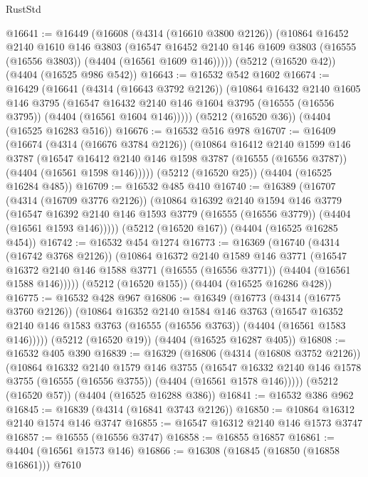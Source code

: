 \begin{lexlean}{RustStd}
\begin{coremodule}
{\begin{coremodule}
{{{{{{{{{{{{{{{{@16641 := @16449
    (@16608
      (@4314 (@16610 @3800 @2126))
      (@10864
        @16452
        @2140
        @1610
        @146
        @3803
        (@16547 @16452 @2140 @146 @1609 @3803 (@16555 (@16556 @3803)) (@4404 (@16561 @1609 @146)))))
    (@5212 (@16520 @42))
    (@4404 (@16525 @986 @542))
@16643 := @16532 @542 @1602
@16674 := @16429
    (@16641
      (@4314 (@16643 @3792 @2126))
      (@10864
        @16432
        @2140
        @1605
        @146
        @3795
        (@16547 @16432 @2140 @146 @1604 @3795 (@16555 (@16556 @3795)) (@4404 (@16561 @1604 @146)))))
    (@5212 (@16520 @36))
    (@4404 (@16525 @16283 @516))
@16676 := @16532 @516 @978
@16707 := @16409
    (@16674
      (@4314 (@16676 @3784 @2126))
      (@10864
        @16412
        @2140
        @1599
        @146
        @3787
        (@16547 @16412 @2140 @146 @1598 @3787 (@16555 (@16556 @3787)) (@4404 (@16561 @1598 @146)))))
    (@5212 (@16520 @25))
    (@4404 (@16525 @16284 @485))
@16709 := @16532 @485 @410
@16740 := @16389
    (@16707
      (@4314 (@16709 @3776 @2126))
      (@10864
        @16392
        @2140
        @1594
        @146
        @3779
        (@16547 @16392 @2140 @146 @1593 @3779 (@16555 (@16556 @3779)) (@4404 (@16561 @1593 @146)))))
    (@5212 (@16520 @167))
    (@4404 (@16525 @16285 @454))
@16742 := @16532 @454 @1274
@16773 := @16369
    (@16740
      (@4314 (@16742 @3768 @2126))
      (@10864
        @16372
        @2140
        @1589
        @146
        @3771
        (@16547 @16372 @2140 @146 @1588 @3771 (@16555 (@16556 @3771)) (@4404 (@16561 @1588 @146)))))
    (@5212 (@16520 @155))
    (@4404 (@16525 @16286 @428))
@16775 := @16532 @428 @967
@16806 := @16349
    (@16773
      (@4314 (@16775 @3760 @2126))
      (@10864
        @16352
        @2140
        @1584
        @146
        @3763
        (@16547 @16352 @2140 @146 @1583 @3763 (@16555 (@16556 @3763)) (@4404 (@16561 @1583 @146)))))
    (@5212 (@16520 @19))
    (@4404 (@16525 @16287 @405))
@16808 := @16532 @405 @390
@16839 := @16329
    (@16806
      (@4314 (@16808 @3752 @2126))
      (@10864
        @16332
        @2140
        @1579
        @146
        @3755
        (@16547 @16332 @2140 @146 @1578 @3755 (@16555 (@16556 @3755)) (@4404 (@16561 @1578 @146)))))
    (@5212 (@16520 @57))
    (@4404 (@16525 @16288 @386))
@16841 := @16532 @386 @962
@16845 := @16839 (@4314 (@16841 @3743 @2126))
@16850 := @10864 @16312 @2140 @1574 @146 @3747
@16855 := @16547 @16312 @2140 @146 @1573 @3747
@16857 := @16555 (@16556 @3747)
@16858 := @16855 @16857
@16861 := @4404 (@16561 @1573 @146)
@16866 := @16308 (@16845 (@16850 (@16858 @16861))) @7610
}}}}}}}}}}}}}}}}
\end{coremodule}}
\end{coremodule}
\end{lexlean}
